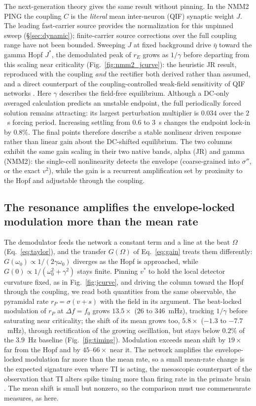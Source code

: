 \documentclass[11pt,a4paper]{article}
\newcommand{\Sig}{\sigma}
\begin{document}
The next-generation theory gives the same result without pinning. In the NMM2 PING the
coupling $C$ is the \emph{literal} mean inter-neuron (QIF) synaptic weight $J$.
The leading fast-carrier source provides the normalization for this unpinned
sweep (\S\ref{sec:dynamic}); finite-carrier source corrections over the full
coupling range have not been bounded. Sweeping $J$ at fixed background drive
$\bar\eta$ toward the gamma Hopf $J^*$, the demodulated peak of $r_E$ grows as
$1/\gamma$ before departing from this scaling near criticality
(Fig.~\ref{fig:nmm2_jcurve}): the heuristic JR
result, reproduced with the coupling \emph{and} the rectifier both derived rather than
assumed, and a direct counterpart of the coupling-controlled weak-field sensitivity of
QIF networks \cite{clusella2023}. Here $\gamma$ describes the field-free equilibrium.
Although a DC-only averaged calculation predicts an unstable endpoint, the full
periodically forced solution remains attracting: its largest perturbation
multiplier is $0.034$ over the $2$~s forcing period. Increasing settling from
$0.6$ to $3$~s changes the endpoint lock-in by $0.8\%$. The final points therefore
describe a stable nonlinear driven response rather than linear gain about the
DC-shifted equilibrium. The two columns exhibit the same gain scaling in
their two native bands, alpha (JR) and gamma (NMM2): the single-cell nonlinearity
detects the envelope (coarse-grained into $\Sig''$, or the exact $v^2$), while the
gain is a recurrent amplification set by proximity to the
Hopf and adjustable through the coupling.

\subsection{The resonance amplifies the envelope-locked modulation more than the mean rate}\label{sec:timing}
The demodulator feeds the network a constant term and a line at the beat $\Omega$
(Eq.~\eqref{eq:taylor}), and the transfer $G(\Omega)$ of Eq.~\eqref{eq:gain} treats them
differently: $G(\omega_0)\propto1/(2\gamma\omega_0)$ diverges as the Hopf is approached,
while $G(0)\propto1/(\omega_0^2+\gamma^2)$ stays finite. Pinning $v^*$ to hold the local detector
curvature fixed, as in Fig.~\ref{fig:jcurve}, and driving the column toward the Hopf
through the coupling, we read both quantities from the same observable, the pyramidal
rate $r_P=\Sig(v+s)$ with the field in its argument. The beat-locked modulation of $r_P$ at
$\Delta f=f_0$ grows $13.5\times$ ($26$ to $346$~mHz), tracking $1/\gamma$ before
saturating near criticality; the shift of its mean grows too, $5.8\times$ ($-1.3$ to
$-7.7$~mHz), through rectification of the growing oscillation, but stays below $0.2\%$ of
the $3.9$~Hz baseline (Fig.~\ref{fig:timing}). Modulation exceeds mean shift by $19\times$
far from the Hopf and by $45$--$66\times$ near it. The network amplifies the
envelope-locked modulation far more than the mean rate, so a small mean-rate change is
the expected signature even where TI is acting, the mesoscopic counterpart of the
observation that TI alters spike timing more than firing rate in the primate brain
\cite{vieira2024}. The mean shift is small but nonzero, so the comparison must use
commensurate measures, as here.
\end{document}

